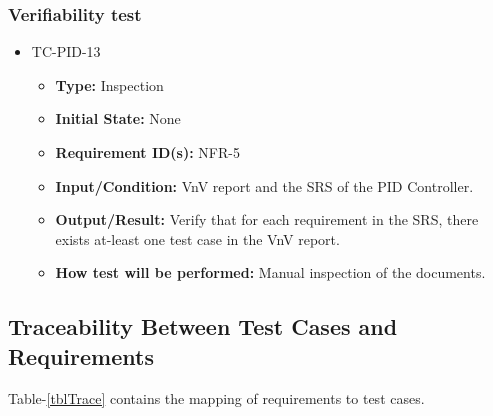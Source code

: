 \documentclass[12pt, titlepage]{article}
\begin{document}
\subsubsection{Verifiability test}

\begin{itemize}
\item{TC-PID-13\\}
\begin{itemize}
\item{\textbf{Type:}} Inspection
					
\item{\textbf{Initial State:}} None

\item{\textbf{Requirement ID(s):}} NFR-5
					
\item{\textbf{Input/Condition:}} VnV report and the SRS of the PID Controller.
					
\item{\textbf{Output/Result:}} Verify that for each requirement in the SRS, there
exists at-least one test case in the VnV report.
 
\item{\textbf{How test will be performed:}} Manual inspection of the documents.
\end{itemize}
\end{itemize}
\subsection{Traceability Between Test Cases and Requirements}


Table-\ref{tblTrace} contains the mapping of requirements to test cases.
  
\end{document}
